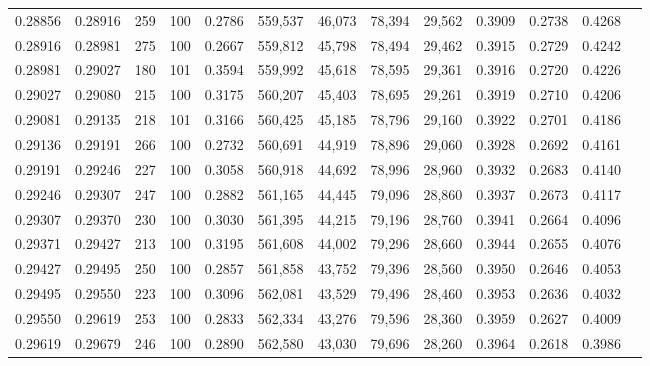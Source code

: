 \begin{tabular}{rrrrrrrrrrrrr}
0.28856 & 0.28916 &   259 & 100 &                                     0.2786 & 559,537 &  46,073 &  78,394 &  29,562 & 0.3909 & 0.2738 & 0.4268 \\
0.28916 & 0.28981 &   275 & 100 &                                     0.2667 & 559,812 &  45,798 &  78,494 &  29,462 & 0.3915 & 0.2729 & 0.4242 \\
0.28981 & 0.29027 &   180 & 101 &                                     0.3594 & 559,992 &  45,618 &  78,595 &  29,361 & 0.3916 & 0.2720 & 0.4226 \\
0.29027 & 0.29080 &   215 & 100 &                                     0.3175 & 560,207 &  45,403 &  78,695 &  29,261 & 0.3919 & 0.2710 & 0.4206 \\
0.29081 & 0.29135 &   218 & 101 &                                     0.3166 & 560,425 &  45,185 &  78,796 &  29,160 & 0.3922 & 0.2701 & 0.4186 \\
0.29136 & 0.29191 &   266 & 100 &                                     0.2732 & 560,691 &  44,919 &  78,896 &  29,060 & 0.3928 & 0.2692 & 0.4161 \\
0.29191 & 0.29246 &   227 & 100 &                                     0.3058 & 560,918 &  44,692 &  78,996 &  28,960 & 0.3932 & 0.2683 & 0.4140 \\
0.29246 & 0.29307 &   247 & 100 &                                     0.2882 & 561,165 &  44,445 &  79,096 &  28,860 & 0.3937 & 0.2673 & 0.4117 \\
0.29307 & 0.29370 &   230 & 100 &                                     0.3030 & 561,395 &  44,215 &  79,196 &  28,760 & 0.3941 & 0.2664 & 0.4096 \\
0.29371 & 0.29427 &   213 & 100 &                                     0.3195 & 561,608 &  44,002 &  79,296 &  28,660 & 0.3944 & 0.2655 & 0.4076 \\
0.29427 & 0.29495 &   250 & 100 &                                     0.2857 & 561,858 &  43,752 &  79,396 &  28,560 & 0.3950 & 0.2646 & 0.4053 \\
0.29495 & 0.29550 &   223 & 100 &                                     0.3096 & 562,081 &  43,529 &  79,496 &  28,460 & 0.3953 & 0.2636 & 0.4032 \\
0.29550 & 0.29619 &   253 & 100 &                                     0.2833 & 562,334 &  43,276 &  79,596 &  28,360 & 0.3959 & 0.2627 & 0.4009 \\
0.29619 & 0.29679 &   246 & 100 &                                     0.2890 & 562,580 &  43,030 &  79,696 &  28,260 & 0.3964 & 0.2618 & 0.3986 \\

\end{tabular}

